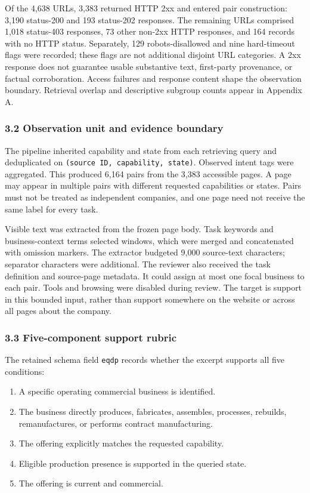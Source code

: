 \documentclass[10pt]{article}
\providecommand{\tightlist}{\setlength{\itemsep}{0pt}\setlength{\parskip}{0pt}}
\begin{document}
Of the 4,638 URLs, 3,383 returned HTTP 2xx and entered pair construction: 3,190 status-200 and 193 status-202 responses. The remaining URLs comprised 1,018 status-403 responses, 73 other non-2xx HTTP responses, and 164 records with no HTTP status. Separately, 129 robots-disallowed and nine hard-timeout flags were recorded; these flags are not additional disjoint URL categories. A 2xx response does not guarantee usable substantive text, first-party provenance, or factual corroboration. Access failures and response content shape the observation boundary. Retrieval overlap and descriptive subgroup counts appear in Appendix A.

\hypertarget{observation-unit-and-evidence-boundary}{%
\subsubsection{3.2 Observation unit and evidence boundary}\label{observation-unit-and-evidence-boundary}}

The pipeline inherited capability and state from each retrieving query and deduplicated on \texttt{(source\ ID,\ capability,\ state)}. Observed intent tags were aggregated. This produced 6,164 pairs from the 3,383 accessible pages. A page may appear in multiple pairs with different requested capabilities or states. Pairs must not be treated as independent companies, and one page need not receive the same label for every task.

Visible text was extracted from the frozen page body. Task keywords and business-context terms selected windows, which were merged and concatenated with omission markers. The extractor budgeted 9,000 source-text characters; separator characters were additional. The reviewer also received the task definition and source-page metadata. It could assign at most one focal business to each pair. Tools and browsing were disabled during review. The target is support in this bounded input, rather than support somewhere on the website or across all pages about the company.

\hypertarget{five-component-support-rubric}{%
\subsubsection{3.3 Five-component support rubric}\label{five-component-support-rubric}}

The retained schema field \texttt{eqdp} records whether the excerpt supports all five conditions:

\begin{enumerate}
\def\labelenumi{\arabic{enumi}.}
\tightlist
\item
  A specific operating commercial business is identified.
\item
  The business directly produces, fabricates, assembles, processes, rebuilds, remanufactures, or performs contract manufacturing.
\item
  The offering explicitly matches the requested capability.
\item
  Eligible production presence is supported in the queried state.
\item
  The offering is current and commercial.
\end{enumerate}
\end{document}
